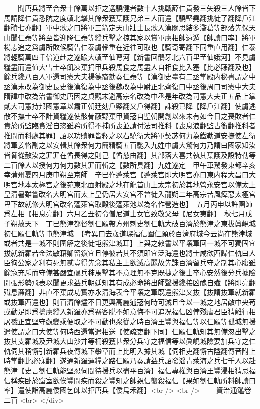 　　聞唐兵將至合衆十餘萬以拒之選驍健者數十人挑戰薛仁貴發三矢殺三人餘皆下馬請降仁貴悉阬之度磧北擊其餘衆獲葉護兄弟三人而還【驍堅堯翻挑徒了翻降戶江翻磧七亦翻】軍中歌之曰將軍三箭定天山壯士長歌入漢關思結多濫葛等部落先保天山聞仁泰等將至皆迎降仁泰等縱兵擊之掠其家以賞軍虜相帥遠遁【帥讀曰率】將軍楊志追之爲虜所敗候騎告仁泰虜輜重在近往可取也【騎奇寄翻下同重直用翻】仁泰將輕騎萬四千倍道赴之遂踰大磧至仙萼河【新書回鶻牙北六百里至仙娥河】不見虜糧盡而還值大雪士卒飢凍棄捐甲兵殺馬食之馬盡人自相食比入塞【比必寐翻及也】餘兵纔八百人軍還司憲大夫楊德裔劾奏仁泰等【漢御史臺有二丞掌殿内秘書謂之中丞漢末改為御史長史後漢復為中丞後魏改為中尉正北齊復曰中丞後周曰司憲中大夫隋諱中改為治書御史唐因之貞觀末避高宗名改為中丞是年改為司憲大夫正五品上掌貳大司憲持邦國憲章以肅正朝廷劾戶槩翻又戶得翻】誅殺已降【降戶江翻】使虜逃散不撫士卒不計資糧遂使骸骨蔽野棄甲資宼自聖朝開創以來未有如今日之喪敗者仁貴於所監臨貪淫自恣雖矜所得不補所喪並請付法司推科【喪息浪翻監古銜翻推科者推問而科處其罪】詔以功贖罪皆釋之以右驍衛大將軍契苾何力為鐵勒道安撫使左衛將軍姜恪副之以安輯其餘衆何力簡精騎五百馳入九姓中虜大驚何力乃謂曰國家知汝皆脅從赦汝之罪罪在酋長得之則己【酋慈由翻】其部落大喜共執其葉護及設特勒等二百餘人以授何力何力數其罪而斬之【數所具翻】九姓遂定　甲午車駕發東都辛亥幸蒲州夏四月庚申朔至京師　辛巳作蓬萊宫【蓬萊宫即大明宫亦曰東内程大昌曰大明宫地本太極宫之後苑東北面射殿之地在龍首山上太宗初於其地營永安宫以備太上皇清暑雖嘗改名大明宫而太上皇仍居大安宫不曾徙入龍朔二年高宗苦風痺惡太極宫卑下故就修大明宫改名蓬萊宫取殿後蓬萊池以為名作營造也】　五月丙申以許圉師爲左相【相息亮翻】六月乙丑初令僧尼道士女官致敬父母【尼女夷翻】　秋七月戊子朔赦天下　丁巳熊津都督劉仁願帶方州刺史劉仁軌大破百濟於熊津之東拔眞峴城初仁願仁軌等屯熊津城　【考異曰去歲道琛福信圍仁願於百濟府城今云尚在熊津城或者共是一城不則圍解之後徙屯熊津城耳】上與之敕書以平壤軍回一城不可獨固宜拔就新羅若金法敏藉卿留鎭宜且停彼若其不須即宜泛海還也將士咸欲西歸仁軌曰人臣徇公家之利有死無貳豈得先念其私主上欲滅高麗故先誅百濟留兵守之制其心腹雖餘宼充斥而守備甚嚴宜礪兵秣馬擊其不意理無不克既捷之後士卒心安然後分兵據險開張形勢飛表以聞更求益兵朝廷知其有成必命將出師聲援纔接凶醜自殱【將即亮翻殱息亷翻】非直不棄成功實亦永清海表今平壤之軍既還熊津又抜【抜謂抜軍就新羅或抜軍西還也】則百濟餘燼不日更興高麗逋宼何時可滅且今以一城之地居敵中央苟或動足即爲擒虜縱入新羅亦爲羇客脱不如意悔不可追况福信凶悖殘虐君臣猜離行相屠戮正宜堅守觀變乘便取之不可動也衆從之時百濟王豐與福信等以仁願等孤城無援遣使謂之曰大使等何時西還當遣相送【使疏吏翻下同】仁願仁軌知其無備忽出擊之抜其支羅城及尹城大山沙井等柵殺獲甚衆分兵守之福信等以眞峴城險要加兵守之仁軌伺其稍懈引新羅兵夜傳城下攀草而上比明入據其城【伺相吏翻懈古隘翻傳音附上時掌翻比必寐翻】遂通新羅運糧之路仁願乃奏請益兵詔發淄青萊海之兵七千人以赴熊津【史言劉仁軌能堅忍伺間待援兵以盡平百濟】福信專權與百濟王豐浸相猜忌福信稱疾卧於窟室欲俟豐問疾而殺之豐知之帥親信襲殺福信【果如劉仁軌所料帥讀曰率】遣使詣高麗倭國乞師以拒唐兵【倭烏禾翻】<br />
<br />
　　資治通鑑卷二百  <br>
   </div> 

